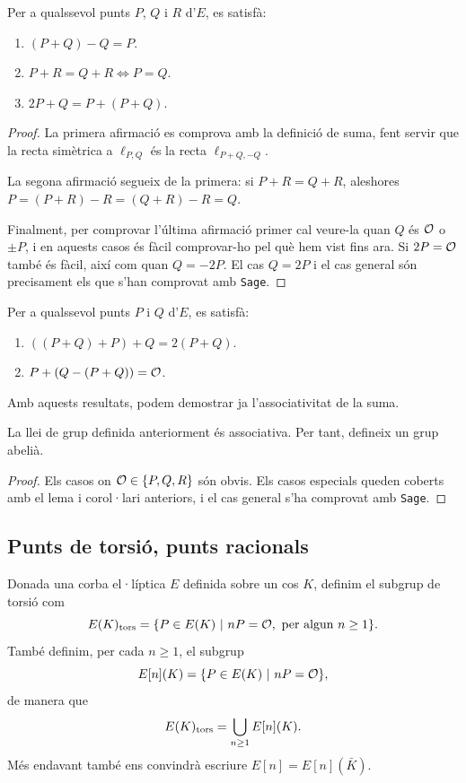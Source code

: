 \begin{lemma}
Per a qualssevol punts $P$, $Q$ i $R$ d'$E$, es satisfà:
 \begin{enumerate}
     \item $(P+Q)-Q = P$.
     \item $P+R = Q+R \iff P = Q$.
     \item $2P + Q = P+(P+Q)$.
 \end{enumerate}
\end{lemma}
\begin{proof}
 La primera afirmació es comprova amb la definició de suma, fent servir que la recta simètrica a $\ell_{P,Q}$ és la recta $\ell_{P+Q,-Q}$.
 
 La segona afirmació segueix de la primera: si $P+R=Q+R$, aleshores $P = (P+R)-R = (Q+R) -R = Q$.
 
 Finalment, per comprovar l'última afirmació primer cal veure-la quan $Q$ és $\mathcal{O}$ o $\pm P$, i en aquests casos és fàcil comprovar-ho pel què hem vist fins ara. Si $2P=\mathcal{O}$ també és fàcil, així com quan $Q=-2P$. El cas $Q=2P$ i el cas general són precisament els que s'han comprovat amb \texttt{Sage}.
\end{proof}
\begin{corollary}
Per a qualssevol punts $P$ i $Q$ d'$E$, es satisfà:
 \begin{enumerate}
     \item $((P+Q)+P)+Q = 2(P+Q)$.
     \item $P+(Q-(P+Q))=\mathcal{O}$.
 \end{enumerate}
\end{corollary}

Amb aquests resultats, podem demostrar ja l'associativitat de la suma.
\begin{theorem}
La llei de grup definida anteriorment és associativa. Per tant, defineix un grup abelià.
\end{theorem}
\begin{proof}
 Els casos on $\mathcal{O}\in\{P,Q,R\}$ són obvis. Els casos especials queden coberts amb el lema i corol·lari anteriors, i el cas general s'ha comprovat amb \texttt{Sage}.
\end{proof}
 \subsection{Punts de torsió, punts racionals}
 Donada una corba el·líptica $E$ definida sobre un cos $K$, definim el subgrup de torsió com
 \[
 E(K)_{\textrm{tors}} = \{P\in E(K) ~|~ nP=\mathcal{O},\text{ per algun } n\geq 1\}.
 \]
 També definim, per cada $n\geq 1$, el subgrup
 \[
 E[n](K) = \{P\in E(K) ~|~ nP=\mathcal{O}\},
 \]
 de manera que
 \[
 E(K)_{\textrm{tors}} = \bigcup_{n\geq 1} E[n](K).
 \]
 Més endavant també ens convindrà escriure $E[n] = E[n](\bar K)$.
 
